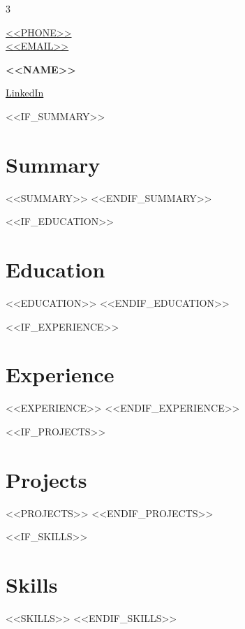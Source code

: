 \documentclass[11pt]{article} %
\begin{document}
\begin{multicols}{3}
  \begin{flushleft}
    \color{gray}{\faPhone} \href{tel:<<PHONE>>}{<<PHONE>>} \\
    \color{gray}{\faEnvelope} \href{mailto:<<EMAIL>>}{<<EMAIL>>} \\
  \end{flushleft}
  
\columnbreak

  \begin{center}
      {\huge\bfseries <<NAME>>} \par
  \end{center}

\columnbreak

  \begin{flushright}
    \href{<<LINKEDIN>>}{LinkedIn} {\color{gray}{\faLinkedin}} \\
  \end{flushright}
\end{multicols}

<<IF_SUMMARY>>
\section{Summary}
<<SUMMARY>>
<<ENDIF_SUMMARY>>

<<IF_EDUCATION>>
\section{Education}
<<EDUCATION>>
<<ENDIF_EDUCATION>>

<<IF_EXPERIENCE>>
\section{Experience}
<<EXPERIENCE>>
<<ENDIF_EXPERIENCE>>

<<IF_PROJECTS>>
\section{Projects}
<<PROJECTS>>
<<ENDIF_PROJECTS>>

<<IF_SKILLS>>
\section{Skills}
<<SKILLS>>
<<ENDIF_SKILLS>>
\end{document}
